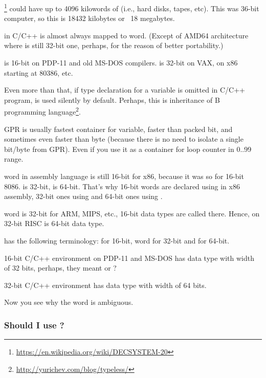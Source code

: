 \footnote{\url{https://en.wikipedia.org/wiki/DECSYSTEM-20}}
could have up to 4096 kilowords of 
(i.e., hard disks, tapes, etc).
This was 36-bit computer, so this is 18432 kilobytes or ~18 megabytes.

\myhrule{}

 in C/C++ is almost always mapped to \gls{word}.
(Except of AMD64 architecture where  is still 32-bit one, perhaps, for the reason of better portability.)

 is 16-bit on PDP-11 and old MS-DOS compilers.
 is 32-bit on VAX, on x86 starting at 80386, etc.

Even more than that, if type declaration for a variable is omitted in C/C++ program,  is used silently by default.
Perhaps, this is inheritance of B programming language\footnote{\url{http://yurichev.com/blog/typeless/}}.

\myhrule{}

\ac{GPR} is usually fastest container for variable, faster than packed bit,
and sometimes even faster than byte (because there is no need to isolate a single bit/byte from \ac{GPR}).
Even if you use it as a container for loop counter in 0..99 range.

\myhrule{}

\Gls{word} in assembly language is still 16-bit for x86, because it was so for 16-bit 8086.
 is 32-bit,  is 64-bit.
That's why 16-bit words are declared using  in x86 assembly, 32-bit ones using  and 64-bit ones using .

\Gls{word} is 32-bit for ARM, MIPS, etc., 16-bit data types are called  there.
Hence,  on 32-bit RISC is 64-bit data type.

 has the following terminology:  for 16-bit, \gls{word} for 32-bit and  for 64-bit.

16-bit C/C++ environment on PDP-11 and MS-DOS has  data type with width of 32 bits, perhaps,
they meant  or ?

32-bit C/C++ environment has  data type with width of 64 bits.

Now you see why the  word is ambiguous.

\subsubsection{Should I use ?}

